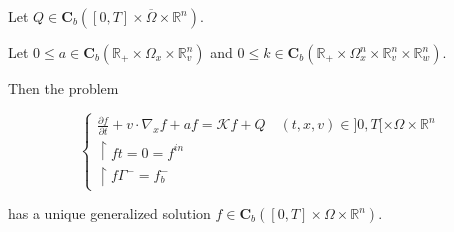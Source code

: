\documentclass[onecolumn, 12pt, a4paper]{article}
\begin{document}
	Let $Q \in \mathbf{C}_b([0,T] \times \overline{\Omega} \times \mathbb{R}^n)$.
	
	Let $0 \leq a \in \mathbf{C}_b(\mathbb{R}_+ \times \Omega_x \times \mathbb{R}_v^n)$ and $0 \leq k \in \mathbf{C}_b(\mathbb{R}_+ \times \Omega_x^n \times \mathbb{R}_v^n \times \mathbb{R}_w^n)$.
	
	Then the problem
	
	\[
	\begin{cases}
		\frac{\partial f}{\partial t}+v \cdot \nabla_x f +af =   \mathcal{K} f +Q \quad (t,x,v) \in ]0,T[ \times \Omega \times \mathbb{R}^n\\
		\restriction{f}{t=0}= f^{in}\\
		\restriction{f}{\Gamma^-}=f_b^-
	\end{cases}
	\]
	
	has a unique generalized solution $f \in \mathbf{C}_b([0,T] \times \Omega \times \mathbb{R}^n)$.
	
	
	
	
\end{document}
